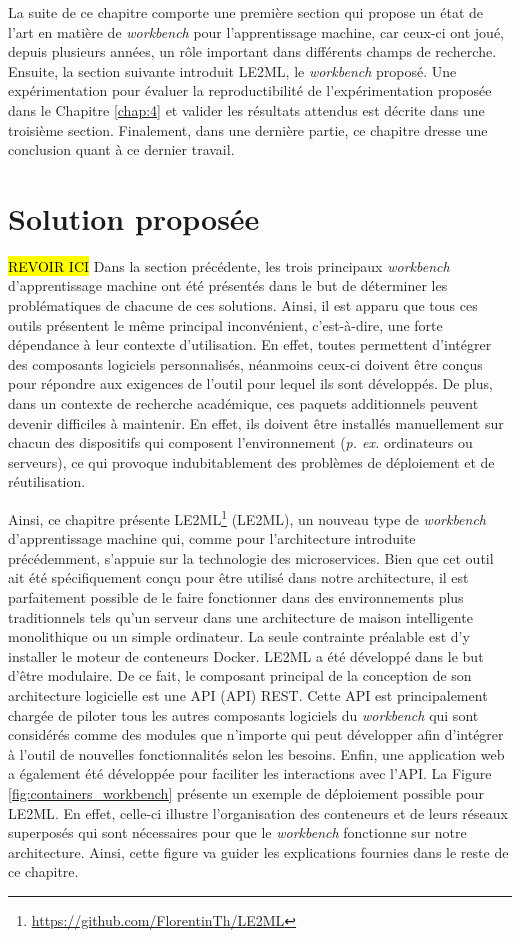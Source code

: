 La suite de ce chapitre comporte une première section qui propose un état de l'art en matière de \textit{workbench} pour l'apprentissage machine, car ceux-ci ont joué, depuis plusieurs années, un rôle important dans différents champs de recherche. Ensuite, la section suivante introduit \acs{LE2ML}, le \textit{workbench} proposé. Une expérimentation pour évaluer la reproductibilité de l'expérimentation proposée dans le Chapitre \ref{chap:4} et valider les résultats attendus est décrite dans une troisième section. Finalement, dans une dernière partie, ce chapitre dresse une conclusion quant à ce dernier travail.

\section{Solution proposée}

\hl{REVOIR ICI}
Dans la section précédente, les trois principaux \textit{workbench} d'apprentissage machine ont été présentés dans le but de déterminer les problématiques de chacune de ces solutions. Ainsi, il est apparu que tous ces outils présentent le même principal inconvénient, c'est-à-dire, une forte dépendance à leur contexte d'utilisation. En effet, toutes permettent d'intégrer des composants logiciels personnalisés, néanmoins ceux-ci doivent être conçus pour répondre aux exigences de l'outil pour lequel ils sont développés. De plus, dans un contexte de recherche académique, ces paquets additionnels peuvent devenir difficiles à maintenir. En effet, ils doivent être installés manuellement sur chacun des dispositifs qui composent l'environnement (\textit{p. ex.} ordinateurs ou serveurs), ce qui provoque indubitablement des problèmes de déploiement et de réutilisation.

Ainsi, ce chapitre présente \acs{LE2ML}\footnote{\url{https://github.com/FlorentinTh/LE2ML}} (\acl{LE2ML}), un nouveau type de \textit{workbench} d'apprentissage machine qui, comme pour l'architecture introduite précédemment, s'appuie sur la technologie des microservices. Bien que cet outil ait été spécifiquement conçu pour être utilisé dans notre architecture, il est parfaitement possible de le faire fonctionner dans des environnements plus traditionnels tels qu'un serveur dans une architecture de maison intelligente monolithique ou un simple ordinateur. La seule contrainte préalable est d'y installer le moteur de conteneurs Docker. LE2ML a été développé dans le but d'être modulaire. De ce fait, le composant principal de la conception de son architecture logicielle est une \acs{API} (\acl{API}) \acs{REST}. Cette API est principalement chargée de piloter tous les autres composants logiciels du \textit{workbench} qui sont considérés comme des modules que n'importe qui peut développer afin d'intégrer à l'outil de nouvelles fonctionnalités selon les besoins. Enfin, une application web a également été développée pour faciliter les interactions avec l'\acs{API}. La Figure \ref{fig:containers_workbench} présente un exemple de déploiement possible pour \acs{LE2ML}. En effet, celle-ci illustre l'organisation des conteneurs et de leurs réseaux superposés qui sont nécessaires pour que le \textit{workbench} fonctionne sur notre architecture. Ainsi, cette figure va guider les explications fournies dans le reste de ce chapitre.

